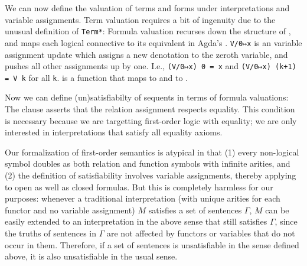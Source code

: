 \documentclass[12pt]{article}
\begin{document}
We can now define the valuation of terms and forms under interpretations and 
variable assignments. Term valuation requires a bit of ingenuity due to the 
unusual definition of \verb|Term*|:
Formula valuation recurses down the structure of , and maps 
each logical connective to its equivalent in Agda's .
\verb|V/0↦x| is an variable assignment update which assigns a new denotation 
to the zeroth variable, and pushes all other assignments up by one. I.e.,
\verb|(V/0↦x) 0 = x| and \verb|(V/0↦x) (k+1) = V k| for all \verb|k|. 
 is a function that maps 
to  and  to .

Now we can define (un)satisfiabilty of sequents in terms of formula valuations: 
The \AgdaSpace{} clause asserts that the
relation assignment  respects equality. This condition is necessary
because we are targetting first-order logic with equality; we are only 
interested in interpretations that satisfy all equality axioms.

Our formalization of first-order semantics is atypical in that (1) every non-logical 
symbol doubles as both relation and function symbols with infinite arities, and 
(2) the definition of satisfiability involves variable assignments, thereby applying to
open as well as closed formulas. But this is completely harmless for our purposes:
whenever a traditional interpretation (with unique arities for each functor and no 
variable assignment) $M$ satisfies a set of sentences $\Gamma$, $M$ can be easily extended 
to an interpretation in the above sense that still satisfies $\Gamma$, since the 
truths of sentences in $\Gamma$ are not affected by functors or variables that do not 
occur in them. Therefore, if a set of sentences is unsatisfiable in the sense defined 
above, it is also unsatisfiable in the usual sense. 
\end{document}
